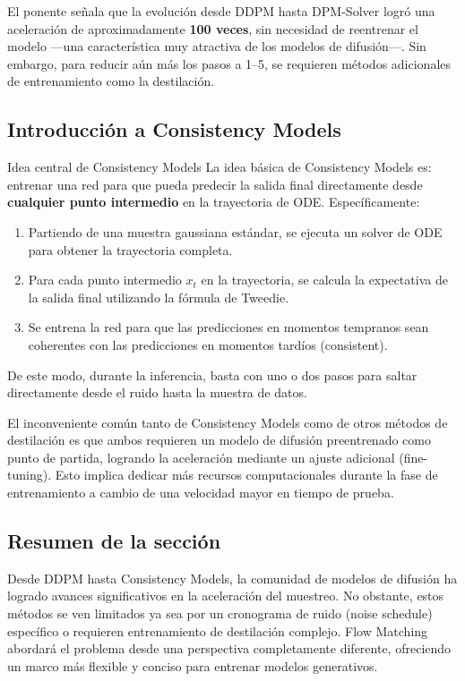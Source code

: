 \documentclass[a4paper]{article}
\begin{document}
El ponente señala que la evolución desde DDPM hasta DPM-Solver logró una aceleración de aproximadamente \textbf{100 veces}, sin necesidad de reentrenar el modelo —una característica muy atractiva de los modelos de difusión—. Sin embargo, para reducir aún más los pasos a 1--5, se requieren métodos adicionales de entrenamiento como la destilación.

\subsection{Introducción a Consistency Models}

\begin{importantbox}{Idea central de Consistency Models}
La idea básica de Consistency Models es: entrenar una red para que pueda predecir la salida final directamente desde \textbf{cualquier punto intermedio} en la trayectoria de ODE. Específicamente:
\begin{enumerate}
    \item Partiendo de una muestra gaussiana estándar, se ejecuta un solver de ODE para obtener la trayectoria completa.
    \item Para cada punto intermedio $x_t$ en la trayectoria, se calcula la expectativa de la salida final utilizando la fórmula de Tweedie.
    \item Se entrena la red para que las predicciones en momentos tempranos sean coherentes con las predicciones en momentos tardíos (consistent).
\end{enumerate}
De este modo, durante la inferencia, basta con uno o dos pasos para saltar directamente desde el ruido hasta la muestra de datos.
\end{importantbox}

El inconveniente común tanto de Consistency Models como de otros métodos de destilación es que ambos requieren un modelo de difusión preentrenado como punto de partida, logrando la aceleración mediante un ajuste adicional (fine-tuning). Esto implica dedicar más recursos computacionales durante la fase de entrenamiento a cambio de una velocidad mayor en tiempo de prueba.

\subsection{Resumen de la sección}

Desde DDPM hasta Consistency Models, la comunidad de modelos de difusión ha logrado avances significativos en la aceleración del muestreo. No obstante, estos métodos se ven limitados ya sea por un cronograma de ruido (noise schedule) específico o requieren entrenamiento de destilación complejo. Flow Matching abordará el problema desde una perspectiva completamente diferente, ofreciendo un marco más flexible y conciso para entrenar modelos generativos.
\end{document}
